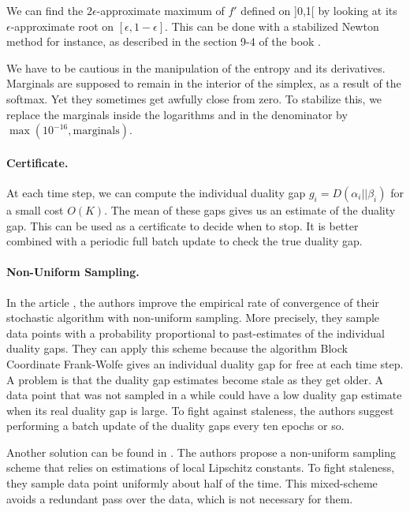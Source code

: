 \documentclass{article}
\DeclareMathOperator{\1}{\mathbb{1}}
\begin{document}
We can find the $2\epsilon$-approximate maximum of $f'$ defined on ]0,1[ by looking at its $\epsilon$-approximate root on $[\epsilon,1-\epsilon]$.
This can be done with a stabilized Newton method for instance, as described in the section 9-4 of the book \cite{press_numerical_1992}.

We have to be cautious in the manipulation of the entropy and its derivatives.
Marginals are supposed to remain in the interior of the simplex, as a result of the softmax.
Yet they sometimes get awfully close from zero.
To stabilize this, we replace the marginals inside the logarithms and in the denominator by $\max(10^{-16}, \textrm{marginals})$.


\paragraph{Certificate.}
At each time step, we can compute the individual duality gap $g_i = D(\alpha_i || \beta_i)$ for a small cost $O(K)$.
The mean of these gaps gives us an estimate of the duality gap.
This can be used as a certificate to decide when to stop.
It is better combined with a periodic full batch update to check the true duality gap.

\paragraph{Non-Uniform Sampling.} 
In the article \cite{osokin_minding_2016}, the authors improve the empirical rate of convergence of their stochastic algorithm with non-uniform sampling.
More precisely, they sample data points with a probability proportional to past-estimates of the individual duality gaps.
They can apply this scheme because the algorithm Block Coordinate Frank-Wolfe \cite{lacoste-julien_block-coordinate_2012} gives an individual duality gap for free at each time step.
A problem is that the duality gap estimates become stale as they get older.
A data point that was not sampled in a while could have a low duality gap estimate when its real duality gap is large.
To fight against staleness, the authors suggest performing a batch update of the duality gaps every ten epochs or so.

Another solution can be found in \cite{schmidt_non-uniform_2015}.
The authors propose a non-uniform sampling scheme that relies on estimations of local Lipschitz constants.
To fight staleness, they sample data point uniformly about half of the time.
This mixed-scheme avoids a redundant pass over the data, which is not necessary for them.
\end{document}
